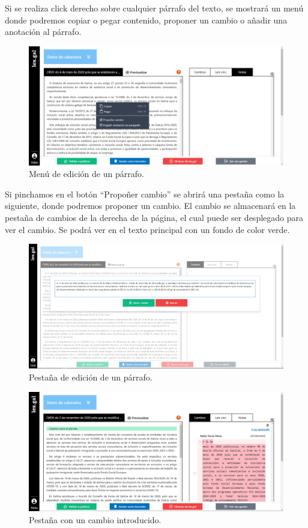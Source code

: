Si se realiza click derecho sobre cualquier párrafo del texto, se mostrará un menú donde podremos copiar o pegar contenido, proponer un cambio o añadir una anotación al párrafo.

\begin{figure}[H]
\centerline{\includegraphics[width=12cm]{figuras/manualUsuario/EditarContextMenu.PNG}}
\caption{Menú de edición de un párrafo.}
\label{enlaceContextMenuLexGal}
\end{figure}

Si pinchamos en el botón ``Propoñer cambio'' se abrirá una pestaña como la siguiente, donde podremos proponer un cambio. El cambio se almacenará en la pestaña de cambios de la derecha de la página, el cual puede ser desplegado para ver el cambio. Se podrá ver en el texto principal con un fondo de color verde.

\begin{figure}[H]
\centerline{\includegraphics[width=12cm]{figuras/manualUsuario/Cambios.PNG}}
\caption{Pestaña de edición de un párrafo.}
\label{enlaceCambios}
\end{figure}

\begin{figure}[H]
\centerline{\includegraphics[width=15cm]{figuras/manualUsuario/PestanaCambios.PNG}}
\caption{Pestaña con un cambio introducido.}
\label{enlacePestanaCambios}
\end{figure}

